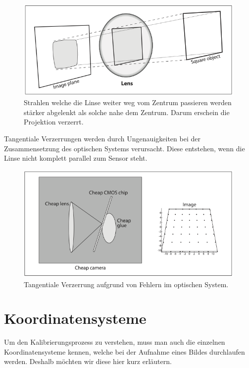 \begin{figure}[!ht]
\centering
\includegraphics[scale=0.5]{images/radial-disortion.png} 
\caption{Strahlen welche die Linse weiter weg vom Zentrum passieren werden stärker abgelenkt als solche nahe dem Zentrum. Darum erschein die Projektion verzerrt. \protect\cite{learningopencv}}
\label{fig:radial-disortion}
\end{figure}
\noindent
Tangentiale Verzerrungen werden durch Ungenauigkeiten bei der Zusammensetzung des optischen Systems verursacht. Diese entstehen, wenn die Linse nicht komplett parallel zum Sensor steht.

\begin{figure}[!ht]
\centering
\includegraphics[scale=0.5]{images/tangential-disortion.png} 
\caption{Tangentiale Verzerrung aufgrund von Fehlern im optischen System. \protect\cite{learningopencv}}
\label{fig:tangential-disortion}
\end{figure}

\section{Koordinatensysteme }
Um den Kalibrierungsprozess zu verstehen, muss man auch die einzelnen Koordinatensysteme kennen, welche bei der Aufnahme eines Bildes durchlaufen werden. Deshalb möchten wir diese hier kurz erläutern.

